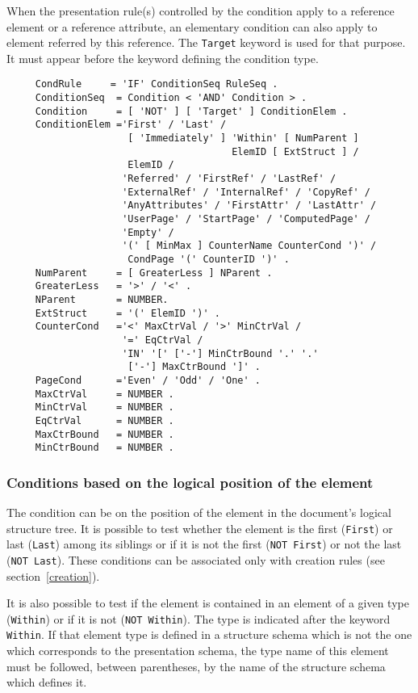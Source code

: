 When the presentation rule(s) controlled by the condition apply to a
reference element or a reference attribute, an elementary condition
can also apply to element referred by this reference.  The {\tt Target}
keyword is used for that purpose.  It must appear before the keyword
defining the condition type.

\begin{verbatim}
     CondRule     = 'IF' ConditionSeq RuleSeq .
     ConditionSeq  = Condition < 'AND' Condition > .
     Condition     = [ 'NOT' ] [ 'Target' ] ConditionElem .
     ConditionElem ='First' / 'Last' /
                     [ 'Immediately' ] 'Within' [ NumParent ]
                                       ElemID [ ExtStruct ] /
                     ElemID /
                    'Referred' / 'FirstRef' / 'LastRef' /
                    'ExternalRef' / 'InternalRef' / 'CopyRef' /
                    'AnyAttributes' / 'FirstAttr' / 'LastAttr' /
                    'UserPage' / 'StartPage' / 'ComputedPage' /
                    'Empty' /
                    '(' [ MinMax ] CounterName CounterCond ')' /
                     CondPage '(' CounterID ')' .
     NumParent     = [ GreaterLess ] NParent .
     GreaterLess   = '>' / '<' .
     NParent       = NUMBER.
     ExtStruct     = '(' ElemID ')' .
     CounterCond   ='<' MaxCtrVal / '>' MinCtrVal /
                    '=' EqCtrVal / 
                    'IN' '[' ['-'] MinCtrBound '.' '.'
                     ['-'] MaxCtrBound ']' .
     PageCond      ='Even' / 'Odd' / 'One' .
     MaxCtrVal     = NUMBER .
     MinCtrVal     = NUMBER .
     EqCtrVal      = NUMBER .
     MaxCtrBound   = NUMBER .
     MinCtrBound   = NUMBER .
\end{verbatim}

\subsubsection{Conditions based on the logical position of the element}

The condition can be on the position of the element in the document's
logical structure tree.  It is possible to test whether the element is
the first ({\tt First}) or last ({\tt Last}) among its siblings or if
it is not the first ({\tt NOT First}) or not the last ({\tt NOT
Last}). These conditions can be associated only with creation rules
(see section~\ref{creation}).

It is also possible to test if the element is contained in an element
of a given type ({\tt Within}) or if it is not ({\tt NOT Within}).
The type is indicated after the keyword {\tt Within}.
If that element type is defined in a structure schema which is
not the one which corresponds to the presentation schema, the type name
of this element must be followed, between parentheses, by the name of
the structure schema which defines it.

